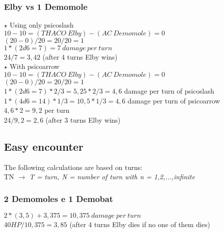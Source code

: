 \subsubsection*{Elby vs 1 Demomole}

$\star$ Using only psicoslash\\
$10-10 = (THACO\:Elby) - (AC\:Demomole) = 0$\\
$(20-0)/20 = 20/20 = 1$\\
$1 * (2d6 = 7) = 7\:damage\:per\:turn$\\
$24 / 7 = 3,42$ (after 4 turns Elby wins)\\
\newline
$\star$ With psicoarrow\\
$10-10 = (THACO\:Elby) - (AC\:Demomole) = 0$\\
$(20-0)/20 = 20/20 = 1$\\
$1 * (2d6 = 7) * 2/3  = 5,25 * 2/3 = 4,6$ damage per turn of psicoslash\\
$1 * (4d6 = 14) * 1/3 = 10,5 * 1/3 = 4,6$ damage per turn of psicoarrow\\
$4,6 * 2 = 9,2$ per turn\\
$24 / 9,2 = 2,6$ (after 3 turns Elby wins)\\

\newpage

\subsection{Easy encounter}
The following calculations are based on turns:\\

TN $\rightarrow$ \textit{T = turn, N = number of turn with n = {1,2,...,infinite}}

\subsubsection*{2 Demomoles e 1 Demobat}
$2*(3,5)+3,375 = 10,375\:damage\:per\:turn$ \\
$40 HP/10,375 =3,85$ (after 4 turns Elby dies if no one of them dies)\\

